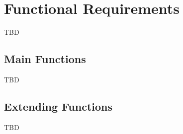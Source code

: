 \section{Functional Requirements}
TBD

\subsection{Main Functions}
TBD

\subsection{Extending Functions}
TBD
